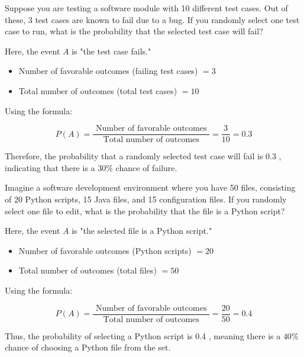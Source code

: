 \begin{example}
    Suppose you are testing a software module with 10 different test cases. Out of these, 3 test cases are known to fail due to a bug. If you randomly select one test case to run, what is the probability that the selected test case will fail?
\end{example}

\begin{solution}
    Here, the event $A$ is "the test case fails."
\begin{itemize}
    \item Number of favorable outcomes (failing test cases) $=3$
    \item Total number of outcomes (total test cases) $=10$
\end{itemize}

Using the formula:

$$
P(A)=\frac{\text { Number of favorable outcomes }}{\text { Total number of outcomes }}=\frac{3}{10}=0.3
$$


Therefore, the probability that a randomly selected test case will fail is 0.3 , indicating that there is a $30 \%$ chance of failure.

\end{solution}

\begin{example}
    Imagine a software development environment where you have 50 files, consisting of 20 Python scripts, 15 Java files, and 15 configuration files. If you randomly select one file to edit, what is the probability that the file is a Python script?
\end{example}

\begin{solution}
Here, the event $A$ is "the selected file is a Python script."
\begin{itemize}
    \item Number of favorable outcomes (Python scripts) $=20$
    \item Total number of outcomes (total files) $=50$
\end{itemize}

Using the formula:

$$
P(A)=\frac{\text { Number of favorable outcomes }}{\text { Total number of outcomes }}=\frac{20}{50}=0.4
$$

Thus, the probability of selecting a Python script is 0.4 , meaning there is a $40 \%$ chance of choosing a Python file from the set.

\end{solution}

